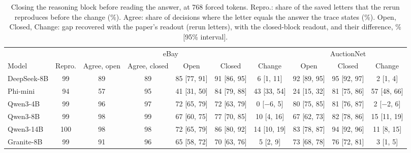 \begin{table}[t]
\caption{Closing the reasoning block before reading the answer, at 768 forced tokens. Repro.: share of the saved letters that the rerun reproduces before the change (\%). Agree: share of decisions where the letter equals the answer the trace states (\%). Open, Closed, Change: gap recovered with the paper's readout (rerun letters), with the closed-block readout, and their difference, \% [95\% interval].}
\label{tab:readout}
\scriptsize
\centering
\setlength{\tabcolsep}{3pt}
\begin{tabular}{lccccccccc}
\toprule
& \multicolumn{6}{c}{eBay} & \multicolumn{3}{c}{AuctionNet} \\ \cmidrule(lr){2-7}\cmidrule(lr){8-10} Model & Repro. & Agree, open & Agree, closed & Open & Closed & Change & Open & Closed & Change \\
\midrule
DeepSeek-8B & 99 & 89 & 89 & 85 [77, 91] & 91 [86, 95] & 6 [1, 11] & 92 [89, 95] & 95 [92, 97] & 2 [1, 4] \\
Phi-mini & 94 & 57 & 95 & 41 [31, 50] & 84 [79, 88] & 43 [33, 54] & 24 [15, 32] & 81 [75, 86] & 57 [48, 66] \\
Qwen3-4B & 99 & 96 & 97 & 72 [65, 79] & 72 [63, 79] & 0 [$-$6, 5] & 80 [75, 85] & 81 [76, 87] & 2 [$-$2, 6] \\
Qwen3-8B & 99 & 98 & 99 & 67 [60, 75] & 77 [70, 85] & 10 [4, 16] & 67 [62, 73] & 82 [78, 86] & 15 [11, 19] \\
Qwen3-14B & 100 & 98 & 98 & 72 [65, 79] & 86 [80, 92] & 14 [10, 19] & 83 [78, 87] & 94 [92, 96] & 11 [8, 15] \\
Granite-8B & 99 & 91 & 96 & 65 [58, 72] & 70 [63, 76] & 5 [2, 9] & 73 [68, 78] & 76 [72, 81] & 3 [1, 5] \\
\bottomrule
\end{tabular}
\end{table}
